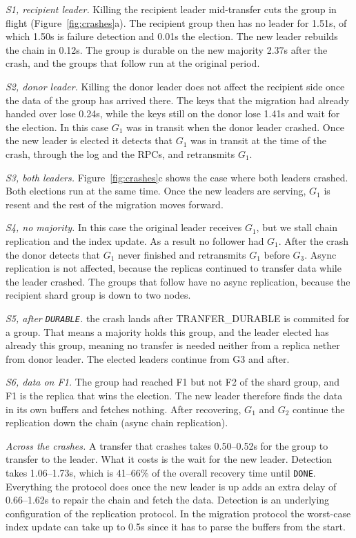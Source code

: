 \noindent\emph{S1, recipient leader.}
Killing the recipient leader mid-transfer cuts the group in flight (Figure~\ref{fig:crashes}a).
The recipient group then has no leader for 1.51s, of which 1.50s is failure detection and 0.01s the election.
The new leader rebuilds the chain in 0.12s.
The group is durable on the new majority 2.37s after the crash, and the groups that follow run at the original period.

\noindent\emph{S2, donor leader.}
Killing the donor leader does not affect the recipient side once the data of the group has arrived there.
The keys that the migration had already handed over lose 0.24s, while the keys still on the donor lose 1.41s and wait for the election.
In this case $G_1$ was in transit when the donor leader crashed.
Once the new leader is elected it detects that $G_1$ was in transit at the time of the crash, through the log and the RPCs, and retransmits $G_1$.

\noindent\emph{S3, both leaders.}
Figure~\ref{fig:crashes}c shows the case where both leaders crashed.
Both elections run at the same time.
Once the new leaders are serving, $G_1$ is resent and the rest of the migration moves forward.

\noindent\emph{S4, no majority.}
In this case the original leader receives $G_1$, but we stall chain replication and the index update.
As a result no follower had $G_1$.
After the crash the donor detects that $G_1$ never finished and retransmits $G_1$ before $G_3$.
Async replication is not affected, because the replicas continued to transfer data while the leader crashed.
The groups that follow have no async replication, because the recipient shard group is down to two nodes.

\noindent\emph{S5, after \texttt{DURABLE}.}
the crash lands after TRANFER\_DURABLE is commited for a group.
That means a majority holds this group, and the leader elected has already this group, meaning no transfer is needed neither from a replica nether from donor leader.
The elected leaders continue from G3 and after.

\noindent\emph{S6, data on F1.}
The group had reached F1 but not F2 of the shard group, and F1 is the replica that wins the election.
The new leader therefore finds the data in its own buffers and fetches nothing.
After recovering, $G_1$ and $G_2$ continue the replication down the chain (async chain replication).

\noindent\emph{Across the crashes.}
A transfer that crashes takes 0.50--0.52s for the group to transfer to the leader.
What it costs is the wait for the new leader.
Detection takes 1.06--1.73s, which is 41--66\% of the overall recovery time until \texttt{DONE}.
Everything the protocol does once the new leader is up adds an extra delay of 0.66--1.62s to repair the chain and fetch the data.
Detection is an underlying configuration of the replication protocol.
In the migration protocol the worst-case index update can take up to 0.5s since it has to parse the buffers from the start.

